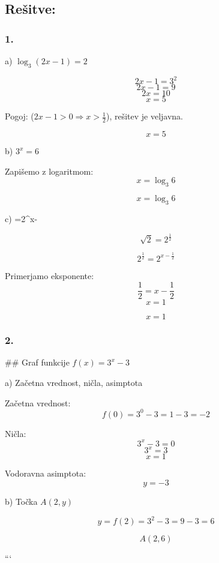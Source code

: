\documentclass[a4paper,12pt]{letter}
\begin{document}
\newpage



\subsection{Rešitve:}
\subsubsection{1.}
 a) $\log_3(2x-1)=2$

\[
2x-1=3^2
\]
\[
2x-1=9
\]
\[
2x=10
\]
\[
x=5
\]

Pogoj: ($2x-1>0 \Rightarrow x>\tfrac12$), rešitev je veljavna.

\[
\boxed{x=5}
\]


b) $3^x=6$

Zapišemo z logaritmom:
$$
x=\log_3 6
$$

$$
\boxed{x=\log_3 6}
$$

 c) =2^{x-}

$$
\sqrt{2}=2^{\frac12}
$$

$$
2^{\frac12}=2^{x-\frac12}
$$

Primerjamo eksponente:
$$
\frac12=x-\frac12
$$
$$
x=1
$$

$$
\boxed{x=1}
$$

\subsubsection{2.}

## Graf funkcije $f(x)=3^x-3$

 a) Začetna vrednost, ničla, asimptota

Začetna vrednost:
$$
f(0)=3^0-3=1-3=-2
$$

Ničla:
$$
3^x-3=0
$$
$$
3^x=3
$$
$$
x=1
$$

Vodoravna asimptota:
$$
y=-3
$$

b) Točka $A(2,y)$

$$
y=f(2)=3^2-3=9-3=6
$$

$$
\boxed{A(2,6)}
$$


```
\end{document}
